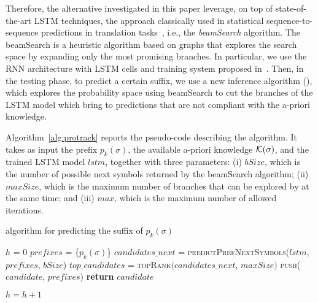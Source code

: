 Therefore, the alternative investigated in this paper leverage, on top of state-of-the-art LSTM techniques, the approach classically used in statistical sequence-to-sequence predictions in translation tasks~\cite{Tillmann2003WRD778822778827}, i.e., the \textit{beamSearch} algorithm. The beamSearch is a heuristic algorithm based on graphs that explores the search space by expanding only the most promising branches.
In particular, we use the RNN architecture with LSTM cells and training system proposed in~\cite{niek96732}. Then, in the testing phase, to predict a certain suffix, we use a new inference algorithm (\protrack), which explores the probability space using beamSearch to cut the branches of the LSTM model which bring to predictions that are not compliant with the a-priori knowledge.

Algorithm~\ref{alg:protrack} reports the pseudo-code describing the \protrack algorithm. It takes as input the prefix $p_k(\sigma)$, the available a-priori knowledge $\cal{K}(\sigma)$, and the trained LSTM model $lstm$, together with three parameters: (i) $bSize$, which is the number of possible next symbols returned by the beamSearch algorithm; (ii) $maxSize$, which is the maximum number of branches that can be explored by \protrack at the same time; and (iii) $max$, which is the maximum number of allowed iterations.

\begin{algorithm}
	\caption{\protrack algorithm for predicting the suffix of $p_k(\sigma)$}
	\label{alg:protrack}
	\begin{algorithmic}[1]
		\State $h$ = 0
		\State $prefixes$ = \{$p_k(\sigma)$\}\label{lst2:initialization}
		 \label{lst2:while}
			\State $candidates\_next$ = \textsc{predictPrefNextSymbols}($lstm$, $prefixes$, $bSize$) \label{lst2:prediction}
			\State $top\_candidates$ = \textsc{topRank}$(candidates\_next$, $maxSize)$ \label{lst2:top}
			 \label{lst2:forall}
						\State \textsc{push}($candidate$, $prefixes$)
\Else
					 \label{lst2:compliant}
\State \textbf{return} $candidate$

\EndIf
				\EndIf
			\EndFor
			\State $h = h + 1$
		\EndWhile
		\EndFunction
	\end{algorithmic}
\end{algorithm}


